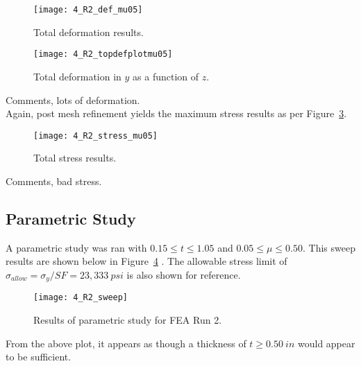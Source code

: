 \begin{figure}[H]
	\centering
	\texttt{[image: 4\_R2\_def\_mu05]}
	\caption{Total deformation results.}
	\label{fig:4_R2_def_mu05}
\end{figure}
\begin{figure}[H]
	\centering
	\texttt{[image: 4\_R2\_topdefplotmu05]}
	\caption{Total deformation in $y$ as a function of $z$.}
	\label{fig:4_R2_topdefplotmu05}
\end{figure}

Comments, lots of deformation.\\

Again, post mesh refinement yields the maximum stress results as per Figure~\ref{fig:4_R2_stress_mu05}.

\begin{figure}[H]
	\centering
	\texttt{[image: 4\_R2\_stress\_mu05]}
	\caption{Total stress results.}
	\label{fig:4_R2_stress_mu05}
\end{figure}

Comments, bad stress.


\subsection{Parametric Study}

A parametric study was ran with $0.15 \leq t \leq 1.05$ and $0.05 \leq \mu \leq 0.50$. This sweep results are shown below in Figure~\ref{fig:4_R2_sweep} \cite{EXCEL}. The allowable stress limit of $\sigma_{allow}=\sigma_{y}/SF = 23,333\ psi$ is also shown for reference.

\begin{figure}[H]
	\centering
	\texttt{[image: 4\_R2\_sweep]}
	\caption{Results of parametric study for FEA Run 2.}
	\label{fig:4_R2_sweep}
\end{figure}

From the above plot, it appears as though a thickness of $t \geq 0.50\ in$ would appear to be sufficient.

